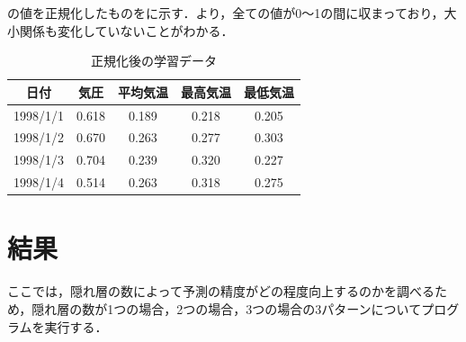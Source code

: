 \documentclass{eithesis}
\begin{document}
		の値を正規化したものをに示す．より，全ての値が0〜1の間に収まっており，大小関係も変化していないことがわかる．
		\begin{table}[htbp]
			\centering 
			\caption{正規化後の学習データ}
			\label{tab_sample_norm}
			\begin{tabular}[htbp]{c|c|c|c|c}
				日付 & 気圧 & 平均気温 & 最高気温 & 最低気温 \\ \hline
				1998/1/1 & 0.618 & 0.189 & 0.218 & 0.205 \\
				1998/1/2 & 0.670 & 0.263 & 0.277 & 0.303 \\
				1998/1/3 & 0.704 & 0.239 & 0.320 & 0.227 \\
				1998/1/4 & 0.514 & 0.263 & 0.318 & 0.275 \\
			\end{tabular}
		\end{table}

\chapter{結果}
	ここでは，隠れ層の数によって予測の精度がどの程度向上するのかを調べるため，隠れ層の数が1つの場合，2つの場合，3つの場合の3パターンについてプログラムを実行する．
\end{document}
